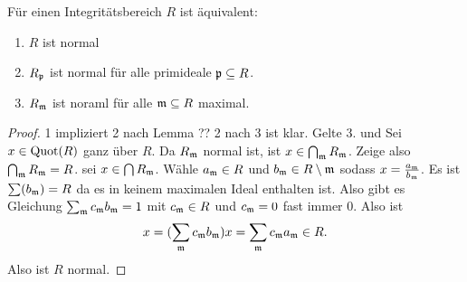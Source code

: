 \begin{Satz}\label{Satz:NormalIntegrit}
	Für einen Integritätsbereich \(R\) ist äquivalent:
	\begin{enumerate}
		\item \(R\) ist normal
		\item \(R_{\mathfrak{p}}\) ist normal für alle primideale \(\mathfrak{p}\subseteq R\).
		\item \(R_{\mathfrak{m}}\) ist noraml für alle \(\mathfrak{m}\subseteq R\) maximal.
	\end{enumerate}
\end{Satz}
\begin{proof}
	1 impliziert 2 nach Lemma ??
	2 nach 3 ist klar.
	Gelte 3. und Sei \(x\in\operatorname{Quot}(R)\) ganz über \(R\). Da \(R_{\mathfrak{m}}\) normal ist, ist \(x\in\bigcap_{\mathfrak{m}} R_{\mathfrak{m}}\). Zeige also \(\bigcap_{\mathfrak{m}} R_{\mathfrak{m}}=R\).
	sei \(x\in \bigcap R_{\mathfrak{m}}\).
	Wähle \(a_{\mathfrak{m}}\in R\) und \(b_{\mathfrak{m}} \in R\setminus\mathfrak{m}\) sodass \(x=\frac{a_{\mathfrak{m}}}{b_{\mathfrak{m}}}\). Es ist \(\sum(b_{\mathfrak{m}})=R\) da es in keinem maximalen Ideal enthalten ist. Also gibt es Gleichung \(\sum_{\mathfrak{m}} c_{\mathfrak{m}} b_{\mathfrak{m}}=1\) mit \(c_{\mathfrak{m}}\in R\) und \(c_{\mathfrak{m}}=0\) fast immer \(0\).
	Also ist \[x=(\sum_{\mathfrak{m}} c_{\mathfrak{m}} b_{\mathfrak{m}})x=\sum_{\mathfrak{m}} c_{\mathfrak{m}} a_{\mathfrak{m}}\in R.\] Also ist \(R\) normal.
\end{proof}
